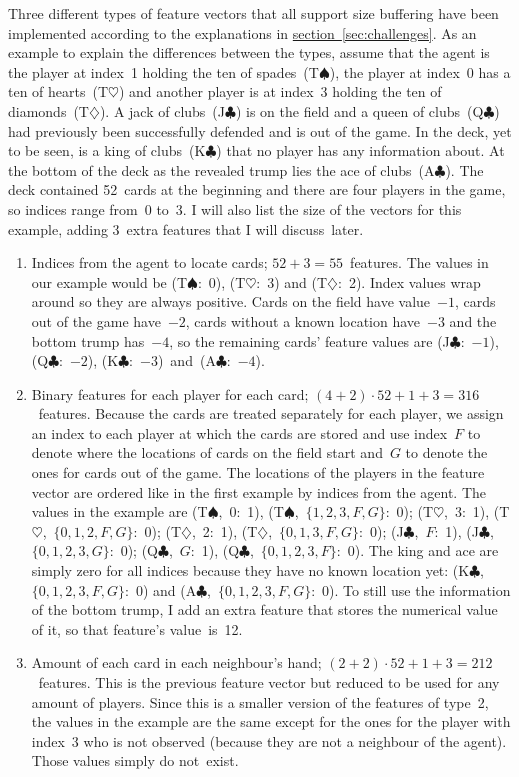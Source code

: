 \documentclass[a4paper,titlepage]{article}
\begin{document}
Three different types of feature vectors that all support size buffering have been implemented according to the explanations in \hyperref[sec:challenges]{section~\ref*{sec:challenges}}.
As an example to explain the differences between the types, assume that the agent is the player at index~1 holding the ten of spades~(T$\spadesuit$), the player at index~0 has a ten of hearts~(T$\heartsuit$) and another player is at index~3 holding the ten of diamonds~(T$\diamondsuit$). A jack of clubs~(J$\clubsuit$) is on the field and a queen of clubs~(Q$\clubsuit$) had previously been successfully defended and is out of the game. In the deck, yet to be seen, is a king of clubs~(K$\clubsuit$) that no player has any information about. At the bottom of the deck as the revealed trump lies the ace of clubs~(A$\clubsuit$). The deck contained 52~cards at the beginning and there are four players in the game, so indices range from~0 to~3. I will also list the size of the vectors for this example, adding 3~extra features that I will discuss~later.
\begin{enumerate} %
  \item Indices from the agent to locate cards; $52 + 3 = 55$~features. The values in our example would be (T$\spadesuit$:~0), (T$\heartsuit$:~3) and (T$\diamondsuit$:~2). Index values wrap around so they are always positive. Cards on the field have value~$-1$, cards out of the game have~$-2$, cards without a known location have~$-3$ and the bottom trump has~$-4$, so the remaining cards' feature values are (J$\clubsuit$:~$-1$), (Q$\clubsuit$:~$-2$), (K$\clubsuit$:~$-3$)~and~(A$\clubsuit$:~$-4$).
  \item Binary features for each player for each card; $(4 + 2) \cdot 52  + 1 + 3 = 316$~features. Because the cards are treated separately for each player, we assign an index to each player at which the cards are stored and use index~$F$ to denote where the locations of cards on the field start and~$G$ to denote the ones for cards out of the game. The locations of the players in the feature vector are ordered like in the first example by indices from the agent. The values in the example are (T$\spadesuit$,~0:~1), (T$\spadesuit$,~$\{1, 2, 3, F, G\}$:~0); (T$\heartsuit$,~3:~1), (T$\heartsuit$,~$\{0, 1, 2, F, G\}$:~0); (T$\diamondsuit$,~2:~1), (T$\diamondsuit$,~$\{0, 1, 3, F, G\}$:~0); (J$\clubsuit$,~$F$:~1), (J$\clubsuit$,~$\{0, 1, 2, 3, G\}$:~0); (Q$\clubsuit$,~$G$:~1), (Q$\clubsuit$,~$\{0, 1, 2, 3, F\}$:~0).
  The king and ace are simply zero for all indices because they have no known location yet: (K$\clubsuit$,~$\{0, 1, 2, 3, F, G\}$:~0) and (A$\clubsuit$,~$\{0, 1, 2, 3, F, G\}$:~0). To still use the information of the bottom trump, I add an extra feature that stores the numerical value of it, so that feature's value~is~12.
  \item Amount of each card in each neighbour's hand; $(2 + 2) \cdot 52 + 1 + 3 = 212$~features. This is the previous feature vector but reduced to be used for any amount of players. Since this is a smaller version of the features of type~2, the values in the example are the same except for the ones for the player with index~3 who is not observed (because they are not a neighbour of the agent). Those values simply do not~exist.
\end{enumerate}
\end{document}
